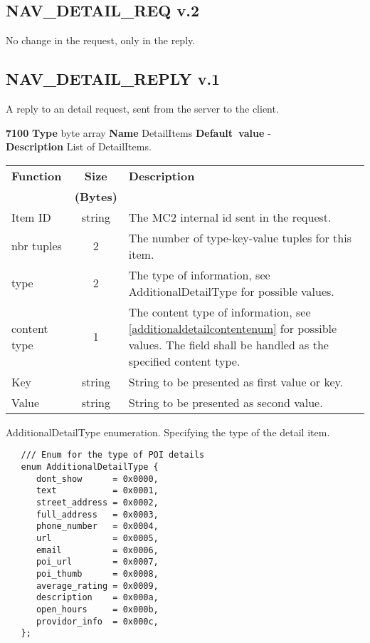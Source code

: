 \documentclass[a4paper]{article}
\begin{document}
\subsection{NAV\_DETAIL\_REQ v.2}

No change in the request, only in the reply.


\subsection{NAV\_DETAIL\_REPLY v.1}

A reply to an detail request, sent from the server
to the client. 
\begin{list}{\textbf{ParamID}}{}
\item \textbf{7100} \textbf{Type} byte array \textbf{Name} DetailItems
                 \textbf{Default~value} - \\
  \label{DetailItems}
  \textbf{Description} List of DetailItems.\\
  \begin{tabular}{|l|c|p{7cm}|}
    \hline
    \textbf{Function} & \textbf{Size}    & \textbf{Description} \\
             & \textbf{(Bytes)} & \\\hline
    Item ID  & string  & The MC2 internal id sent in the request.      \\\hline
    nbr tuples& 2      & The number of type-key-value tuples for this 
                         item.\\\hline
    type     & 2       & The type of information, see AdditionalDetailType 
                         for possible values.                          \\\hline
    content type & 1   & The content type of information, see \ref{additionaldetailcontentenum} 
                         for possible values. The field shall be handled as the 
                         specified content type.                       \\\hline
    Key      & string  & String to be presented as first value or key. \\\hline
    Value    & string  & String to be presented as second value.       \\\hline
  \end{tabular}
\end{list}

\label{additionaldetailenum}
AdditionalDetailType enumeration. Specifying the type of the detail item.
\begin{verbatim}
   /// Enum for the type of POI details
   enum AdditionalDetailType {
      dont_show      = 0x0000, 
      text           = 0x0001, 
      street_address = 0x0002, 
      full_address   = 0x0003,
      phone_number   = 0x0004,
      url            = 0x0005,
      email          = 0x0006,
      poi_url        = 0x0007,
      poi_thumb      = 0x0008,
      average_rating = 0x0009,
      description    = 0x000a,
      open_hours     = 0x000b,
      providor_info  = 0x000c,
   };
\end{verbatim}
\end{document}
